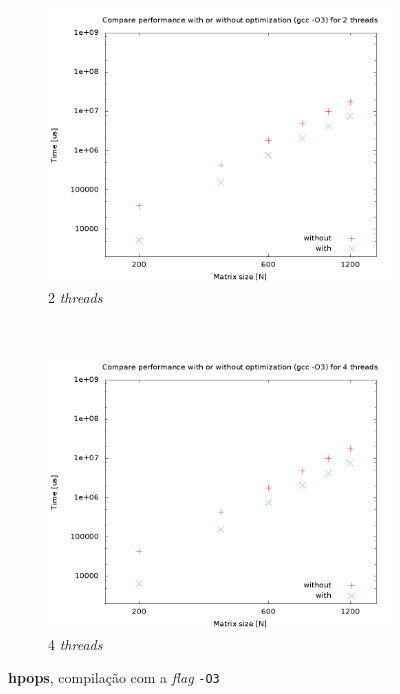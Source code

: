 \documentclass[a4paper, 12pt]{article}
\begin{document}
\begin{figure}[H]
    \centering
    \begin{subfigure}[H]{0.5\textwidth}
        \includegraphics[width=\textwidth]{hpops_cmp_optimization-2t}
        \caption{2 \textit{threads}}
        \label{fig:hpops_o3_2t}
    \end{subfigure}%
    ~ %
    \begin{subfigure}[H]{0.5\textwidth}
        \includegraphics[width=\textwidth]{hpops_cmp_optimization-4t}
        \caption{4 \textit{threads}}
        \label{fig:hpops_o3_4t}
    \end{subfigure}
    \caption{\textbf{hpops}, compilação com a \textit{flag} \texttt{-O3}}\label{fig:animals}
\end{figure}
\end{document}
